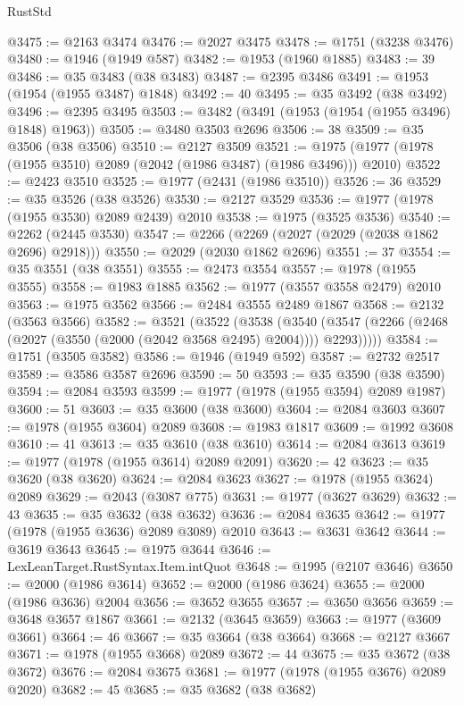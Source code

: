 \begin{lexlean}{RustStd}
\begin{coremodule}
{\begin{coremodule}
{{{{{{{{{{{{{{{{{{{{{{{{{{{{{{{@3475 := @2163 @3474
@3476 := @2027 @3475
@3478 := @1751 (@3238 @3476)
@3480 := @1946 (@1949 @587)
@3482 := @1953 (@1960 @1885)
@3483 := 39
@3486 := @35 @3483 (@38 @3483)
@3487 := @2395 @3486
@3491 := @1953 (@1954 (@1955 @3487) @1848)
@3492 := 40
@3495 := @35 @3492 (@38 @3492)
@3496 := @2395 @3495
@3503 := @3482 (@3491 (@1953 (@1954 (@1955 @3496) @1848) @1963))
@3505 := @3480 @3503 @2696
@3506 := 38
@3509 := @35 @3506 (@38 @3506)
@3510 := @2127 @3509
@3521 := @1975 (@1977 (@1978 (@1955 @3510) @2089 (@2042 (@1986 @3487) (@1986 @3496))) @2010)
@3522 := @2423 @3510
@3525 := @1977 (@2431 (@1986 @3510))
@3526 := 36
@3529 := @35 @3526 (@38 @3526)
@3530 := @2127 @3529
@3536 := @1977 (@1978 (@1955 @3530) @2089 @2439) @2010
@3538 := @1975 (@3525 @3536)
@3540 := @2262 (@2445 @3530)
@3547 := @2266 (@2269 (@2027 (@2029 (@2038 @1862 @2696) @2918)))
@3550 := @2029 (@2030 @1862 @2696)
@3551 := 37
@3554 := @35 @3551 (@38 @3551)
@3555 := @2473 @3554
@3557 := @1978 (@1955 @3555)
@3558 := @1983 @1885
@3562 := @1977 (@3557 @3558 @2479) @2010
@3563 := @1975 @3562
@3566 := @2484 @3555 @2489 @1867
@3568 := @2132 (@3563 @3566)
@3582 := @3521
    (@3522
      (@3538
        (@3540 (@3547 (@2266 (@2468 (@2027 (@3550 (@2000 (@2042 @3568 @2495) @2004)))) @2293)))))
@3584 := @1751 (@3505 @3582)
@3586 := @1946 (@1949 @592)
@3587 := @2732 @2517
@3589 := @3586 @3587 @2696
@3590 := 50
@3593 := @35 @3590 (@38 @3590)
@3594 := @2084 @3593
@3599 := @1977 (@1978 (@1955 @3594) @2089 @1987)
@3600 := 51
@3603 := @35 @3600 (@38 @3600)
@3604 := @2084 @3603
@3607 := @1978 (@1955 @3604) @2089
@3608 := @1983 @1817
@3609 := @1992 @3608
@3610 := 41
@3613 := @35 @3610 (@38 @3610)
@3614 := @2084 @3613
@3619 := @1977 (@1978 (@1955 @3614) @2089 @2091)
@3620 := 42
@3623 := @35 @3620 (@38 @3620)
@3624 := @2084 @3623
@3627 := @1978 (@1955 @3624) @2089
@3629 := @2043 (@3087 @775)
@3631 := @1977 (@3627 @3629)
@3632 := 43
@3635 := @35 @3632 (@38 @3632)
@3636 := @2084 @3635
@3642 := @1977 (@1978 (@1955 @3636) @2089 @3089) @2010
@3643 := @3631 @3642
@3644 := @3619 @3643
@3645 := @1975 @3644
@3646 := LexLeanTarget.RustSyntax.Item.intQuot
@3648 := @1995 (@2107 @3646)
@3650 := @2000 (@1986 @3614)
@3652 := @2000 (@1986 @3624)
@3655 := @2000 (@1986 @3636) @2004
@3656 := @3652 @3655
@3657 := @3650 @3656
@3659 := @3648 @3657 @1867
@3661 := @2132 (@3645 @3659)
@3663 := @1977 (@3609 @3661)
@3664 := 46
@3667 := @35 @3664 (@38 @3664)
@3668 := @2127 @3667
@3671 := @1978 (@1955 @3668) @2089
@3672 := 44
@3675 := @35 @3672 (@38 @3672)
@3676 := @2084 @3675
@3681 := @1977 (@1978 (@1955 @3676) @2089 @2020)
@3682 := 45
@3685 := @35 @3682 (@38 @3682)
}}}}}}}}}}}}}}}}}}}}}}}}}}}}}}}
\end{coremodule}}
\end{coremodule}
\end{lexlean}
